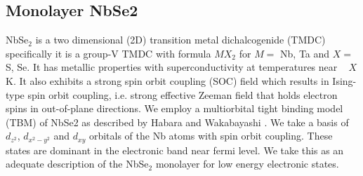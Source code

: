 \documentclass[12pt]{report} %
\begin{document}
\subsection*{Monolayer NbSe2}
  NbSe$_2$ is a two dimensional (2D) transition metal dichalcogenide (TMDC) specifically it is a group-V TMDC with formula $MX_2$ for $M =$ Nb, Ta and $X =$ S, Se. It has metallic properties with superconductivity at temperatures near ~ $X$ K. It also exhibits a strong spin orbit coupling (SOC) field which results in Ising-type spin orbit coupling, i.e. strong effective Zeeman field that holds electron spins in out-of-plane directions. We employ a multiorbital tight binding model (TBM) of NbSe2 as described by Habara and Wakabayashi \cite{Habara2021}. We take a basis of $d_{z^2}$, $d_{x^2 - y^2}$ and $d_{xy}$ orbitals of the Nb atoms with spin orbit coupling. These states are dominant in the electronic band near fermi level. We take this as an adequate description of the NbSe$_2$ monolayer for low energy electronic states.
\end{document}
